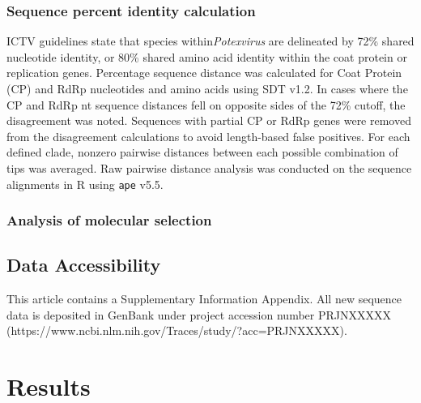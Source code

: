 \documentclass[fleqn,10pt,lineno]{wlpeerj}
\begin{document}
\subsubsection*{Sequence percent identity calculation}
ICTV guidelines state that species within\textit{Potexvirus} are delineated by 72\% shared nucleotide identity, or 80\% shared amino acid identity within the coat protein or replication genes. 
Percentage sequence distance was calculated for Coat Protein (CP) and RdRp nucleotides and amino acids using SDT v1.2. %
In cases where the CP and RdRp nt sequence distances fell on opposite sides of the 72\% cutoff, the disagreement was noted.
Sequences with partial CP or RdRp genes were removed from the disagreement calculations to avoid length-based false positives. %
For each defined clade, nonzero pairwise distances between each possible combination of tips was averaged. 
Raw pairwise distance analysis was conducted on the sequence alignments in R using \texttt{ape} v5.5.
\subsubsection*{Analysis of molecular selection}

\subsection*{Data Accessibility}

This article contains a Supplementary Information Appendix. %
All new sequence data is deposited in GenBank under project accession number PRJNXXXXX (https://www.ncbi.nlm.nih.gov/Traces/study/?acc=PRJNXXXXX). %


\section*{Results}
\end{document}
